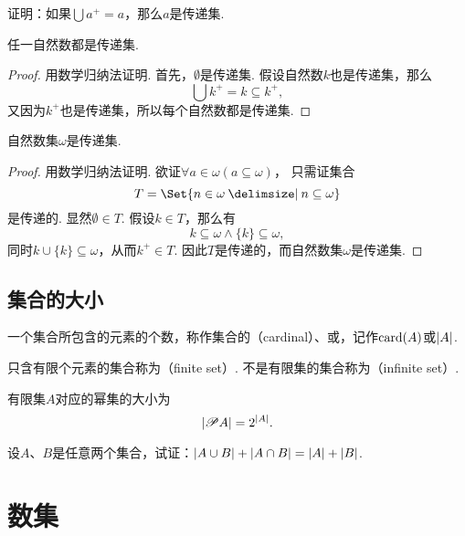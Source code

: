 \begin{example}
证明：如果\(\bigcup a^+ = a\)，那么\(a\)是传递集.
\end{example}

\begin{theorem}
任一自然数都是传递集.
\begin{proof}
用数学归纳法证明.
首先，\(\emptyset\)是传递集.
假设自然数\(k\)也是传递集，那么\[
\bigcup k^+ = k \subseteq k^+,
\]又因为\(k^+\)也是传递集，所以每个自然数都是传递集.
\end{proof}
\end{theorem}

\begin{theorem}
自然数集\(\omega\)是传递集.
\begin{proof}
用数学归纳法证明.
欲证\(\forall a \in \omega ( a \subseteq \omega )\)，%
只需证集合\[
T = \Set{n \in \omega \given n \subseteq \omega}
\]是传递的.
显然\(\emptyset \in T\).
假设\(k \in T\)，那么有\[
k \subseteq \omega
\land
\{k\} \subseteq \omega,
\]同时\(k \cup \{k\} \subseteq \omega\)，从而\(k^+ \in T\).
因此\(T\)是传递的，而自然数集\(\omega\)是传递集.
\end{proof}
\end{theorem}


\subsection{集合的大小}
\begin{definition}
一个集合所包含的元素的个数，称作集合的（cardinal）、或，记作\(\operatorname{card}(A)\)或\(\abs{A}\).
\end{definition}

\begin{definition}
只含有限个元素的集合称为（finite set）.
不是有限集的集合称为（infinite set）.
\end{definition}

\begin{property}
有限集\(A\)对应的幂集的大小为\[
\abs{\mathscr{P} A} = 2^{\abs{A}}.
\]
\end{property}

\begin{example}
设\(A\)、\(B\)是任意两个集合，试证：\(\abs{A \cup B} + \abs{A \cap B} = \abs{A} + \abs{B}\).
\end{example}

\section{数集}
